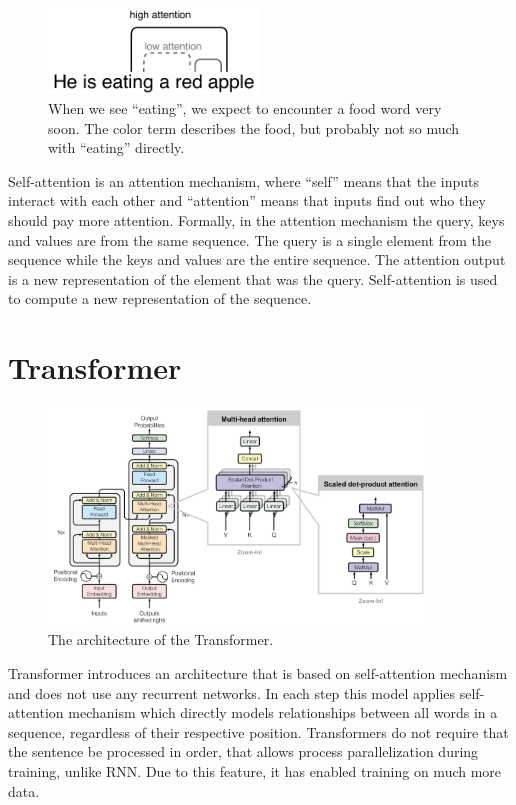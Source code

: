 \begin{figure}[hbt]
  \centering
  \includegraphics[width=0.5\textwidth]{figures/attention.pdf}
  \caption{When we see ``eating'', we expect to encounter a food word very soon. The color term describes the food, but probably not so much with ``eating'' directly.}
  \label{attention}
\end{figure}

Self-attention is an attention mechanism, where ``self'' means that the inputs interact with each other and ``attention'' means that inputs find out who they should pay more attention. Formally, in the attention mechanism the query, keys and values are from the same sequence. The query is a single element from the sequence while the keys and values are the entire sequence. The attention output is a new representation of the element that was the query. Self-attention is used to compute a new representation of the sequence.  

\section{Transformer} 

\begin{figure}[hbt]
  \centering
  \includegraphics[width=0.9\textwidth]{figures/transformer_attention.png}
  \caption[Transformer architecture]{The architecture of the Transformer.\protect\footnotemark}
  \label{transformer}
\end{figure}

Transformer introduces an architecture that is based on self-attention mechanism and does not use any recurrent networks. In each step this model applies self-attention mechanism which directly models relationships between all words in a sequence, regardless of their respective position. Transformers do not require that the sentence be processed in order, that allows process parallelization during training, unlike RNN. Due to this feature, it has enabled training on much more data. 

